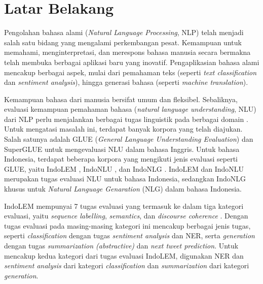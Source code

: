 \section{Latar Belakang}
\label{sec:latar-belakang}

Pengolahan bahasa alami (\textit{Natural Language Processing}, NLP) telah menjadi salah satu bidang yang mengalami perkembangan pesat. Kemampuan untuk memahami, menginterpretasi, dan merespons bahasa manusia secara bermakna telah membuka berbagai aplikasi baru yang inovatif. Pengaplikasian bahasa alami mencakup berbagai aspek, mulai dari pemahaman teks (seperti \textit{text classification} dan \textit{sentiment analysis}), hingga generasi bahasa (seperti \textit{machine translation}).

Kemampuan bahasa dari manusia bersifat umum dan fleksibel. Sebaliknya, evaluasi kemampuan pemahaman bahasa (\textit{natural language understanding}, NLU) dari NLP perlu menjalankan berbagai tugas linguistik pada berbagai domain \parencite{glue}. Untuk mengatasi masalah ini, terdapat banyak korpora yang telah diajukan. Salah satunya adalah GLUE (\textit{General Language Understanding Evaluation}) \parencite{glue} dan SuperGLUE \parencite{superglue} untuk mengevaluasi NLU dalam bahasa Inggris. Untuk bahasa Indonesia, terdapat beberapa korpora yang mengikuti jenis evaluasi seperti GLUE, yaitu IndoLEM \parencite{indolem}, IndoNLU \parencite{indonlu}, dan IndoNLG \parencite{indonlg}. IndoLEM dan IndoNLU merupakan tugas evaluasi NLU untuk bahasa Indonesia, sedangkan IndoNLG khusus untuk \textit{Natural Language Genaration} (NLG) dalam bahasa Indonesia.

IndoLEM mempunyai 7 tugas evaluasi yang termasuk ke dalam tiga kategori evaluasi, yaitu \textit{sequence labelling}, \textit{semantics}, dan \textit{discourse coherence} \parencite{indolem}. Dengan tugas evaluasi pada masing-masing kategori ini mencakup berbagai jenis tugas, seperti \textit{classification} dengan tugas \textit{sentiment analysis} dan NER, serta \textit{generation} dengan tugas \textit{summarization (abstractive)} dan \textit{next tweet prediction}. Untuk mencakup kedua kategori dari tugas evaluasi IndoLEM, digunakan NER dan \textit{sentiment analysis} dari kategori \textit{classification} dan \textit{summarization} dari kategori \textit{generation}.

